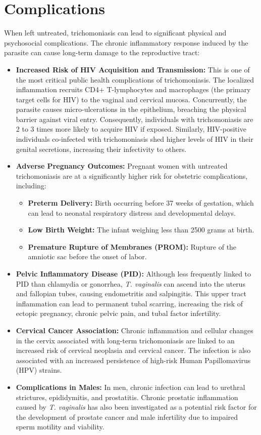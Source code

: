 \section*{Complications}
When left untreated, trichomoniasis can lead to significant physical and psychosocial complications. The chronic inflammatory response induced by the parasite can cause long-term damage to the reproductive tract:
\begin{itemize}
    \item \textbf{Increased Risk of HIV Acquisition and Transmission:} This is one of the most critical public health complications of trichomoniasis. The localized inflammation recruits CD4+ T-lymphocytes and macrophages (the primary target cells for HIV) to the vaginal and cervical mucosa. Concurrently, the parasite causes micro-ulcerations in the epithelium, breaching the physical barrier against viral entry. Consequently, individuals with trichomoniasis are 2 to 3 times more likely to acquire HIV if exposed. Similarly, HIV-positive individuals co-infected with trichomoniasis shed higher levels of HIV in their genital secretions, increasing their infectivity to others.
    \item \textbf{Adverse Pregnancy Outcomes:} Pregnant women with untreated trichomoniasis are at a significantly higher risk for obstetric complications, including:
    \begin{itemize}
        \item \textbf{Preterm Delivery:} Birth occurring before 37 weeks of gestation, which can lead to neonatal respiratory distress and developmental delays.
        \item \textbf{Low Birth Weight:} The infant weighing less than 2500 grams at birth.
        \item \textbf{Premature Rupture of Membranes (PROM):} Rupture of the amniotic sac before the onset of labor.
    \end{itemize}
    \item \textbf{Pelvic Inflammatory Disease (PID):} Although less frequently linked to PID than chlamydia or gonorrhea, \textit{T. vaginalis} can ascend into the uterus and fallopian tubes, causing endometritis and salpingitis. This upper tract inflammation can lead to permanent tubal scarring, increasing the risk of ectopic pregnancy, chronic pelvic pain, and tubal factor infertility.
    \item \textbf{Cervical Cancer Association:} Chronic inflammation and cellular changes in the cervix associated with long-term trichomoniasis are linked to an increased risk of cervical neoplasia and cervical cancer. The infection is also associated with an increased persistence of high-risk Human Papillomavirus (HPV) strains.
    \item \textbf{Complications in Males:} In men, chronic infection can lead to urethral strictures, epididymitis, and prostatitis. Chronic prostatic inflammation caused by \textit{T. vaginalis} has also been investigated as a potential risk factor for the development of prostate cancer and male infertility due to impaired sperm motility and viability.
\end{itemize}


